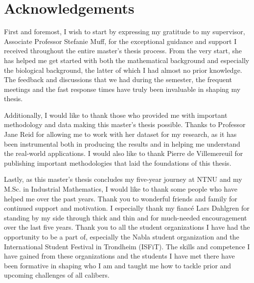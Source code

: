 \chapter*{Acknowledgements}


First and foremost, I wish to start by expressing my gratitude to my supervisor, Associate Professor Stefanie Muff, for the exceptional guidance and support I received throughout the entire master's thesis process. From the very start, she has helped me get started with both the mathematical background and especially the biological background, the latter of which I had almost no prior knowledge. The feedback and discussions that we had during the semester, the frequent meetings and the fast response times have truly been invaluable in shaping my thesis.

Additionally, I would like to thank those who provided me with important methodology and data making this master's thesis possible. Thanks to Professor Jane Reid for allowing me to work with her dataset for my research, as it has been instrumental both in producing the results and in helping me understand the real-world applications. I would also like to thank Pierre de Villemereuil for publishing important methodologies that laid the foundations of this thesis.

Lastly, as this master's thesis concludes my five-year journey at NTNU and my M.Sc. in Industrial Mathematics, I would like to thank some people who have helped me over the past years. Thank you to wonderful friends and family for continued support and motivation. I especially thank my fiancé Lars Dahlgren for standing by my side through thick and thin and for much-needed encouragement over the last five years. Thank you to all the student organizations I have had the opportunity to be a part of, especially the Nabla student organization and the International Student Festival in Trondheim (ISFiT). The skills and competence I have gained from these organizations and the students I have met there have been formative in shaping who I am and taught me how to tackle prior and upcoming challenges of all calibers.